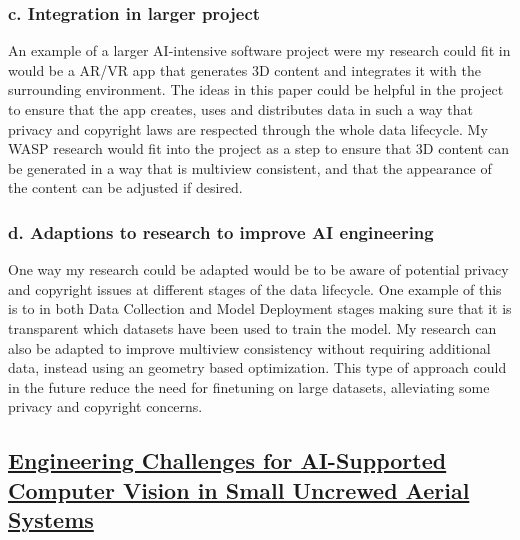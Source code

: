 \documentclass[11pt]{article}
\begin{document}
\subsubsection*{c. Integration in larger project}
An example of a larger AI-intensive software project were my research could fit in would be a AR/VR app that generates 3D content and integrates it with the surrounding environment. The ideas in this paper could be helpful in the project to ensure that the app creates, uses and distributes data in such a way that privacy and copyright laws are respected through the whole data lifecycle. My WASP research would fit into the project as a step to ensure that 3D content can be generated in a way that is multiview consistent, and that the appearance of the content can be adjusted if desired.
\subsubsection*{d. Adaptions to research to improve AI engineering}
One way my research could be adapted would be to be aware of potential privacy and copyright issues at different stages of the data lifecycle. One example of this is to in both Data Collection and Model Deployment stages making sure that it is transparent which datasets have been used to train the model. My research can also be adapted to improve multiview consistency without requiring additional data, instead using an geometry based optimization. This type of approach could in the future reduce the need for finetuning on large datasets, alleviating some privacy and copyright concerns. 



\subsection*{\href{https://www.researchgate.net/publication/370654882_Engineering_Challenges_for_AI-Supported_Computer_Vision_in_Small_Uncrewed_Aerial_Systems}{Engineering Challenges for AI-Supported Computer Vision in Small Uncrewed Aerial Systems}}
\end{document}
